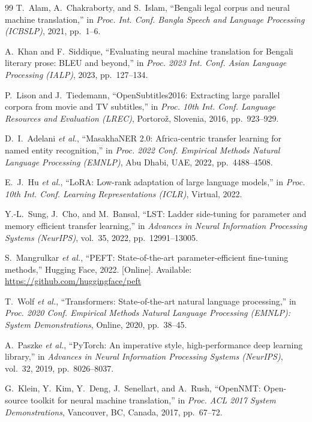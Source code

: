 \documentclass[conference]{IEEEtran}
\begin{document}
\begin{thebibliography}{99}
T.~Alam, A.~Chakraborty, and S.~Islam,
``Bengali legal corpus and neural machine translation,''
in \emph{Proc. Int. Conf. Bangla Speech and Language Processing (ICBSLP)},
2021, pp.~1--6.

A.~Khan and F.~Siddique,
``Evaluating neural machine translation for Bengali literary prose:
BLEU and beyond,''
in \emph{Proc. 2023 Int. Conf. Asian Language Processing (IALP)},
2023, pp.~127--134.

P.~Lison and J.~Tiedemann,
``OpenSubtitles2016: Extracting large parallel corpora from movie and
TV subtitles,''
in \emph{Proc. 10th Int. Conf. Language Resources and Evaluation (LREC)},
Portoro\v{z}, Slovenia, 2016, pp.~923--929.

D.~I.~Adelani \textit{et al.},
``MasakhaNER 2.0: Africa-centric transfer learning for named entity
recognition,''
in \emph{Proc. 2022 Conf. Empirical Methods Natural Language Processing
(EMNLP)},
Abu Dhabi, UAE, 2022, pp.~4488--4508.

E.~J.~Hu \textit{et al.},
``LoRA: Low-rank adaptation of large language models,''
in \emph{Proc. 10th Int. Conf. Learning Representations (ICLR)},
Virtual, 2022.

Y.-L.~Sung, J.~Cho, and M.~Bansal,
``LST: Ladder side-tuning for parameter and memory efficient transfer
learning,''
in \emph{Advances in Neural Information Processing Systems (NeurIPS)},
vol.~35, 2022, pp.~12991--13005.

S.~Mangrulkar \textit{et al.},
``PEFT: State-of-the-art parameter-efficient fine-tuning methods,''
Hugging Face, 2022. [Online].
Available: \url{https://github.com/huggingface/peft}

T.~Wolf \textit{et al.},
``Transformers: State-of-the-art natural language processing,''
in \emph{Proc. 2020 Conf. Empirical Methods Natural Language Processing
(EMNLP): System Demonstrations},
Online, 2020, pp.~38--45.

A.~Paszke \textit{et al.},
``PyTorch: An imperative style, high-performance deep learning library,''
in \emph{Advances in Neural Information Processing Systems (NeurIPS)},
vol.~32, 2019, pp.~8026--8037.

G.~Klein, Y.~Kim, Y.~Deng, J.~Senellart, and A.~Rush,
``OpenNMT: Open-source toolkit for neural machine translation,''
in \emph{Proc. ACL 2017 System Demonstrations},
Vancouver, BC, Canada, 2017, pp.~67--72.


\end{thebibliography}
\end{document}
